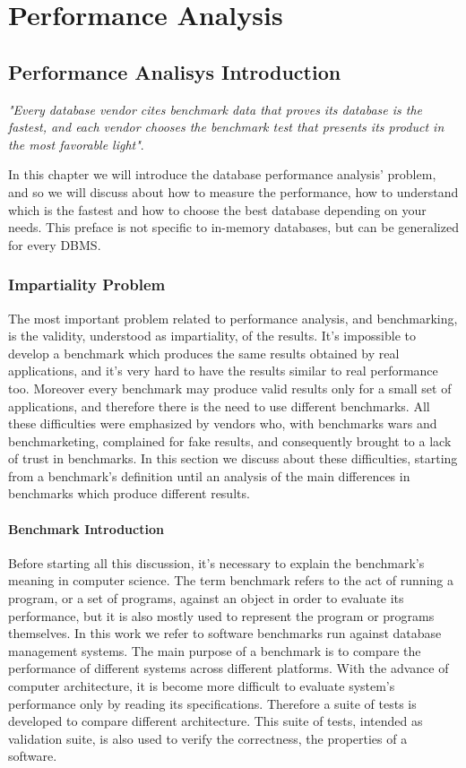 \part{Performance Analysis}

\chapter{Performance Analisys Introduction} \label{analysis-introduction}
\emph{"Every database vendor cites benchmark data that proves its database is the fastest, and each vendor chooses the benchmark test that presents its product in the most favorable light"}\cite{burleson}.

In this chapter we will introduce the database performance analysis' problem, and so we will discuss about how to measure the performance, how to understand which is the fastest and how to choose the best database depending on your needs. This preface is not specific to in-memory databases, but can be generalized for every DBMS.
	
	\section{Impartiality Problem}
The most important problem related to performance analysis, and benchmarking, is the validity, understood as impartiality, of the results. It's impossible to develop a benchmark which produces the same results obtained by real applications, and it's very hard to have the results similar to real performance too. Moreover every benchmark may produce valid results only for a small set of applications, and therefore there is the need to use different benchmarks. All these difficulties were emphasized by vendors who, with benchmarks wars and benchmarketing, complained for fake results, and consequently brought to a lack of trust in benchmarks. In this section we discuss about these difficulties, starting from a benchmark's definition until an analysis of the main differences in benchmarks which produce different results.

		\subsection{Benchmark Introduction}
Before starting all this discussion, it's necessary to explain the benchmark's meaning in computer science. The term benchmark refers to the act of running a program, or a set of programs, against an object in order to evaluate its performance, but it is also mostly used to represent the program or programs themselves. In this work we refer to software benchmarks run against database management systems. The main purpose of a benchmark is to compare the performance of different systems across different platforms. With the advance of computer architecture, it is become more difficult to evaluate system's performance only by reading its specifications. Therefore a suite of tests is developed to compare different architecture. This suite of tests, intended as validation suite, is also used to verify the correctness, the properties of a software. 

